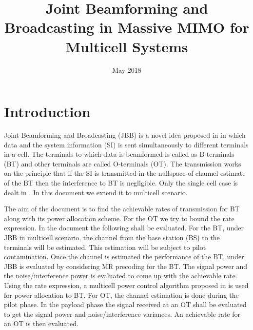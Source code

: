 \documentclass[10pt, a4paper, twoside,fleqn]{article}
\title{Joint Beamforming and Broadcasting in Massive MIMO for Multicell Systems}
\author{}
\date{May 2018}
\begin{document}
\maketitle
 
\section{Introduction}
	Joint Beamforming and Broadcasting (JBB) is a novel idea proposed in \cite{bib:jbb} in which data and the system information (SI) is sent simultaneously to different terminals in a cell. The terminals to which data is beamformed is called as B-terminals (BT) and other terminals are called O-terminals (OT). The transmission works on the principle that if the SI is transmitted in the nullspace of channel estimate of the BT then the interference to BT is negligible. Only the single cell case is dealt in \cite{bib:jbb}. In this document we extend it to multicell scenario.

	
	The aim of the document is to find the achievable rates of transmission for BT along with its power allocation scheme. For the OT we try to bound the rate expression. In the document the following shall be evaluated. For the BT, under JBB in multicell scenario, the channel from the base station (BS) to the terminals will be estimated. This estimation will be subject to pilot contamination. Once the channel is estimated the performance of the BT, under JBB is evaluated by considering MR precoding for the BT. The signal power and the noise/interference power is evaluated to come up with the achievable rate. Using the rate expression, a multicell power control algorithm proposed in \cite{bib:MassiveMimoBook} is used for power allocation to BT.
     For OT, the channel estimation is done during the pilot phase. In the payload phase the signal received at an OT shall be evaluated to get the signal power and noise/interference variances. An achievable rate for an OT is then evaluated.
\end{document}
